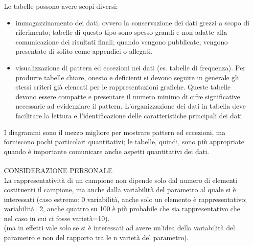 \documentclass[10pt, draft]{book}
\newcommand{\tightlist}{%
\setlength{\itemsep}{1pt}\setlength{\parskip}{0pt}\setlength{\parsep}{0pt}}
\begin{document}
Le tabelle possono avere scopi diversi:
\begin{itemize} \tightlist
    \item immagazzinamento dei dati, ovvero la conservazione dei dati grezzi a scopo di riferimento; tabelle di questo tipo sono spesso grandi e non adatte alla comunicazione dei risultati finali; quando vengono pubblicate, vengono presentate di solito come appendici o allegati.
    \item visualizzazione di pattern ed eccezioni nei dati (es. tabelle di frequenza). Per produrre tabelle chiare, onesto e deficienti si devono seguire in generale gli stessi criteri già elencati per le rappresentazioni grafiche. Queste tabelle devono essere compatte e presentare il numero minimo di cifre significative necessarie ad evidenziare il pattern. L'organizzazione dei dati in tabella deve facilitare la lettura e l'identificazione delle caratteristiche principali dei dati.
\end{itemize}
I diagrammi sono il mezzo migliore per mostrare pattern ed eccezioni, ma forniscono pochi particolari quantitativi; le tabelle, quindi, sono più appropriate quando è importante comunicare anche aspetti quantitativi dei dati.
\\
\\
CONSIDERAZIONE PERSONALE
\\
La rappresentatività di un campione non dipende solo dal numero di elementi costituenti il campione, ma anche dalla variabilità del parametro al quale si è interessati (caso estremo: 0 variabilità, anche solo un elemento è rappresentativo; variabilità=2, anche quattro su 100 è più probabile che sia rappresentativo che nel caso in cui ci fosse varietà=10).
\\
(ma in effetti vale solo se si è interessati ad avere un'idea della variabilità del parametro e non del rapporto tra le n varietà del parametro).
\end{document}
